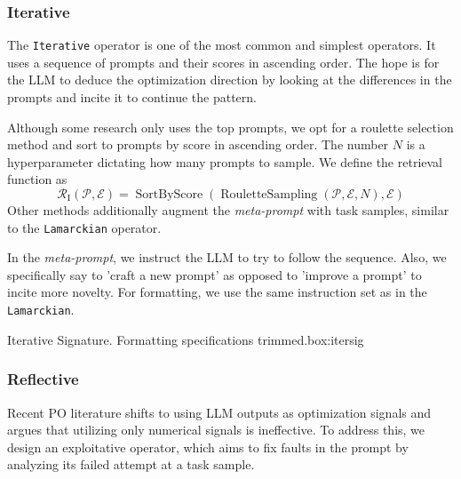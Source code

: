 \subsubsection{Iterative}
The \texttt{Iterative} operator is one of the most common and simplest operators. 
It uses a sequence of prompts and their scores in ascending order.
The hope is for the LLM to deduce the optimization direction by looking at the differences in the prompts and incite it to continue the pattern.

Although some research\cite{yang2024largelanguagemodelsoptimizers} only uses the top prompts, we opt for a roulette selection method
and sort to prompts by score in ascending order. The number $N$ is a hyperparameter dictating how many prompts to sample.
We define the retrieval function as
\begin{equation}
   \mathcal{R}_{\text{I}}(\mathcal{P}, \mathcal{E}) = \operatorname{SortByScore}(\operatorname{RouletteSampling}(\mathcal{P}, \mathcal{E}, N), \mathcal{E})
\end{equation}
Other methods\cite{tang2024unleashingpotentiallargelanguage} additionally augment the \textit{meta-prompt} with task samples, similar to the \texttt{Lamarckian} operator.

In the \textit{meta-prompt}, we instruct the LLM to try to follow the sequence. Also, we specifically say to 'craft a new prompt'
as opposed to 'improve a prompt' to incite more novelty. For formatting, we use the same instruction set as in the \texttt{Lamarckian}.
\begin{figurebox}{Iterative Signature. Formatting specifications trimmed.}{box:itersig}
\end{figurebox}

\subsubsection{Reflective}
Recent PO literature\cite{xiang2025selfsupervisedpromptoptimization} shifts to using LLM outputs as optimization signals
and argues that utilizing only numerical signals is ineffective. To address this, we design an exploitative operator, which
aims to fix faults in the prompt by analyzing its failed attempt at a task sample. 

